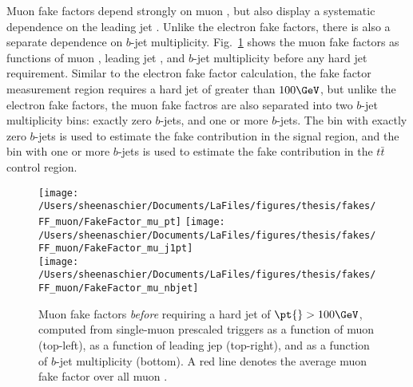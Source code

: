 Muon fake factors depend strongly on muon \pt, but also display a systematic dependence on the leading jet \pt{}.  Unlike the electron fake factors, there is also a separate dependence on $b$-jet multiplicity.  Fig.~\ref{fig:muon_FF_hist_noCut} shows the muon fake factors as functions of muon \pt{}, leading jet \pt{}, and $b$-jet multiplicity before any hard jet requirement.  Similar to the electron fake factor calculation, the fake factor measurement region requires a hard jet of \pt{} greater than $100\GeV$, but unlike the electron fake factors, the muon fake factros are also separated into two $b$-jet multiplicity bins: exactly zero $b$-jets, and one or more $b$-jets.  The bin with exactly zero $b$-jets is used to estimate the fake contribution in the signal region, and the bin with one or more $b$-jets is used to estimate the fake contribution in the $t\bar{t}$ control region.

\begin{figure}[tbp]
  \centering
  \texttt{[image: /Users/sheenaschier/Documents/LaFiles/figures/thesis/fakes/FF\_muon/FakeFactor\_mu\_pt]}
  \texttt{[image: /Users/sheenaschier/Documents/LaFiles/figures/thesis/fakes/FF\_muon/FakeFactor\_mu\_j1pt]}\\
  \texttt{[image: /Users/sheenaschier/Documents/LaFiles/figures/thesis/fakes/FF\_muon/FakeFactor\_mu\_nbjet]}\\
  \caption{Muon fake factors \textit{before} requiring a hard jet of $\pt{}> 100\GeV$, computed from single-muon prescaled triggers as a function of muon \pt{} (top-left), as a function of leading jep \pt{} (top-right), and as a function of $b$-jet multiplicity (bottom). A red line denotes the average muon fake factor over all muon \pt{}.}
  \label{fig:muon_FF_hist_noCut}
\end{figure}

